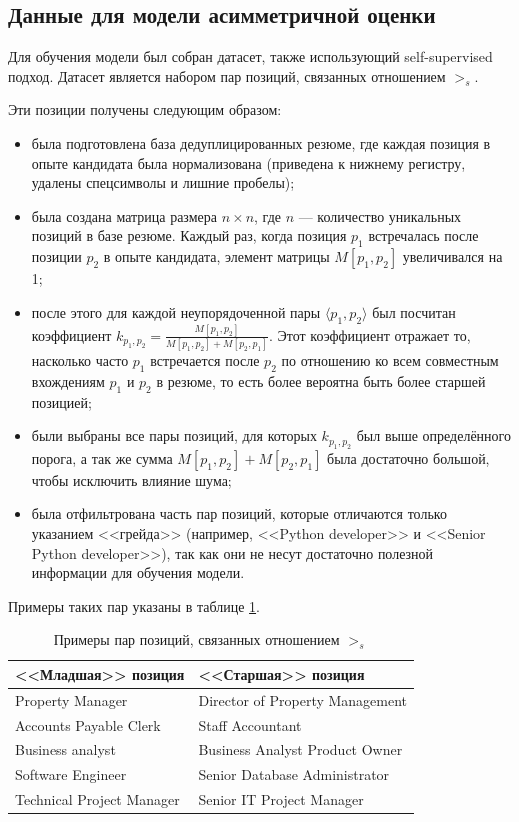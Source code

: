 \documentclass[14pt]{mmcs_article}
\begin{document}
  \subsection{Данные для модели асимметричной оценки}

  Для обучения модели был собран датасет, также использующий self-supervised подход. Датасет является набором пар позиций, связанных отношением $>_{s}$.

  Эти позиции получены следующим образом:

  \begin{itemize}
    \item была подготовлена база дедуплицированных резюме, где каждая позиция в опыте кандидата была нормализована (приведена к нижнему регистру, удалены спецсимволы и лишние пробелы);
    \item была создана матрица размера $n \times n$, где $n$ --- количество уникальных позиций в базе резюме. Каждый раз, когда позиция $p_1$ встречалась после позиции $p_2$ в опыте кандидата, элемент матрицы $M[p_1, p_2]$ увеличивался на 1;
    \item после этого для каждой неупорядоченной пары $\langle p_1, p_2 \rangle$ был посчитан коэффициент $k_{p_1, p_2} = \frac{M[p_1, p_2]}{M[p_1, p_2] + M[p_2, p_1]}$. Этот коэффициент отражает то, насколько часто $p_1$ встречается после $p_2$ по отношению ко всем совместным вхождениям $p_1$ и $p_2$ в резюме, то есть более вероятна быть более старшей позицией;
    \item были выбраны все пары позиций, для которых $k_{p_1, p_2}$ был выше определённого порога, а так же сумма $M[p_1, p_2] + M[p_2, p_1]$ была достаточно большой, чтобы исключить влияние шума;
    \item была отфильтрована часть пар позиций, которые отличаются только указанием <<грейда>> (например, <<Python developer>> и <<Senior Python developer>>), так как они не несут достаточно полезной информации для обучения модели.
  \end{itemize}

  Примеры таких пар указаны в таблице \ref{tab:seniority_pairs}.

  \begin{table}[H]
    \centering
    \caption{\centering Примеры пар позиций, связанных отношением $>_{s}$}
    \label{tab:seniority_pairs}
    \begin{tabular}{|l|l|}
      \hline
      \textbf{<<Младшая>> позиция} & \textbf{<<Старшая>> позиция}    \\
      \hline
      Property Manager             & Director of Property Management \\
      \hline
      Accounts Payable Clerk       & Staff Accountant                \\
      \hline
      Business analyst             & Business Analyst Product Owner  \\
      \hline
      Software Engineer            & Senior Database Administrator   \\
      \hline
      Technical Project Manager    & Senior IT Project Manager       \\
      \hline
    \end{tabular}
  \end{table}
\end{document}

